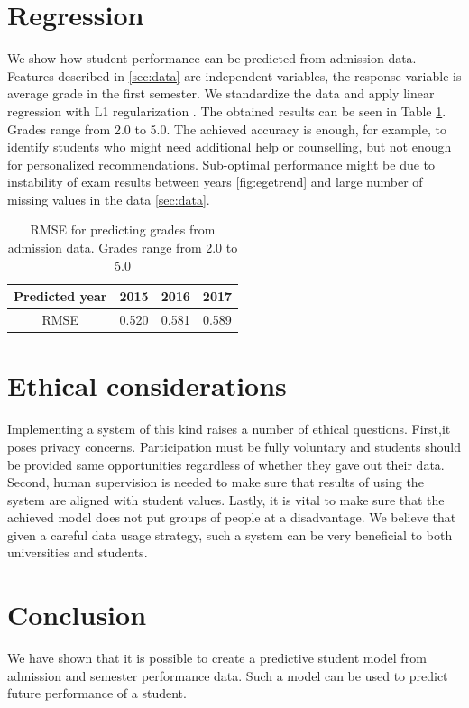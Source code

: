 \documentclass{article}
\begin{document}
\section{Regression}
We show how student performance can be predicted from admission data. Features described in \ref{sec:data} are independent variables, the response variable is average grade in the first semester. We standardize the data and apply linear regression with L1 regularization \cite{lasso}. The obtained results can be seen in Table \ref{table_regression}. Grades range from 2.0 to 5.0. The achieved accuracy is enough, for example, to identify students who might need additional help or counselling, but not enough for personalized recommendations. Sub-optimal performance might be due to instability of exam results between years \ref{fig:egetrend} and large number of missing values in the data \ref{sec:data}. 

\begin{table}[h!]
\captionsetup{justification=centering}
\centering
\caption{RMSE for predicting grades from admission data. Grades range from 2.0 to 5.0}
\begin{tabular}{ |c||c|c|c| } 
 \hline
 Predicted year & 2015 & 2016 & 2017 \\ 
 \hline
 RMSE & 0.520 & 0.581 & 0.589 \\
 \hline
\end{tabular}
\label{table_regression}
\end{table}

\section{Ethical considerations}
Implementing a system of this kind raises a number of  ethical questions. First,it poses privacy concerns. Participation must be fully voluntary and students should be provided same opportunities regardless of whether they gave out their data. Second, human supervision is needed to make sure that results of using the system are aligned with student values. Lastly, it is vital to make sure that the achieved model does not put groups of people at a disadvantage.
We believe that given a careful data usage strategy, such a system can be very beneficial to both universities and students.

\section{Conclusion}
We have shown that it is possible to create a predictive student model from admission and semester performance data. Such a model can be used to predict future performance of a student.


\end{document}
